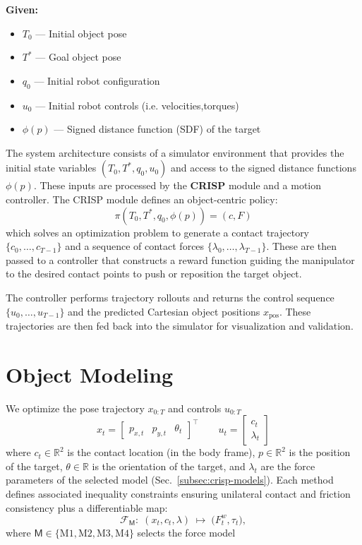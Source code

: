 \documentclass[conference]{IEEEtran}
\begin{document}
\textbf{Given:}
\begin{itemize}
    \item $T_0$ — Initial object pose
    \item $T^*$ — Goal object pose
    \item $q_0$ — Initial robot configuration
    \item $u_{0}$ — Initial robot controls (i.e. velocities,torques)
    \item $\phi(p)$ — Signed distance function (SDF) of the target  
\end{itemize}

\medskip
\noindent The system architecture consists of a simulator environment that provides the initial state variables $(T_0, T^*, q_0, u_0)$ and access to the signed distance functions $\phi(p)$. These inputs are processed by the \textbf{CRISP} module and a motion controller. The CRISP module defines an object-centric policy:
\[
\pi(T_0, T^*, q_0, \phi(p)) = (c, F)
\]
which solves an optimization problem to generate a contact trajectory $\{c_0, \dots, c_{T-1}\}$ and a sequence of contact forces $\{\lambda_0, \dots, \lambda_{T-1}\}$. These are then passed to a controller that constructs a reward function guiding the manipulator to the desired contact points to push or reposition the target object.

The controller performs trajectory rollouts and returns the control sequence $\{u_0, \dots, u_{T-1}\}$ and the predicted Cartesian object positions $x_{\text{pos}}$. These trajectories are then fed back into the simulator for visualization and validation.
\newpage

\section{Object Modeling}
\noindent We optimize the pose trajectory $x_{0:T}$ and controls $u_{0:T}$
\[
x_t=\begin{bmatrix}p_{x,t}&p_{y,t}&\theta_t\end{bmatrix}^\top\qquad
u_t=\begin{bmatrix} c_t\\ \lambda_t\end{bmatrix}
\]
where $c_t\!\in\!\mathbb{R}^2$ is the contact location (in the body frame), $p\!\in\!\mathbb{R}^2$ is the position of the target, $\theta\!\in\!\mathbb{R}$ is the orientation of the target, and $\lambda_t$ are the force parameters of the selected model (Sec.~\ref{subsec:crisp-models}). Each method defines associated inequality constraints ensuring unilateral contact and friction consistency plus a differentiable map:
\[
\mathcal{F}_\mathsf M:\;(x_t, c_t, \lambda)\;\mapsto\; \big( F^w_t,\tau_t\big),
\]
where $\mathsf M\in\{\text{M1},\text{M2},\text{M3},\text{M4}\}$ selects the force model
\medskip
\end{document}
